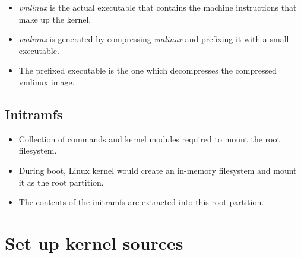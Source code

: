 \documentclass{beamer}
\begin{document}
\begin{frame}
  \begin{itemize}
  \item \emph{vmlinux} is the actual executable that contains the machine
    instructions that make up the kernel.
  \item \emph{vmlinuz} is generated by compressing \emph{vmlinux} and
    prefixing it with a small executable.
  \item The prefixed executable is the one which decompresses the compressed
    vmlinux image.
  \end{itemize}
  \begin{center}
\end{center}
\end{frame}

\subsection{Initramfs}
\begin{frame}
  \begin{itemize}
  \item Collection of commands and kernel modules required to mount the root
    filesystem.
  \item During boot, Linux kernel would create an in-memory filesystem and
    mount it as the root partition.
  \item The contents of the initramfs are extracted into this root partition.
  \end{itemize}
\end{frame}


\section{Set up kernel sources}
\label{sec:set-up-kernel-1}
\end{document}
